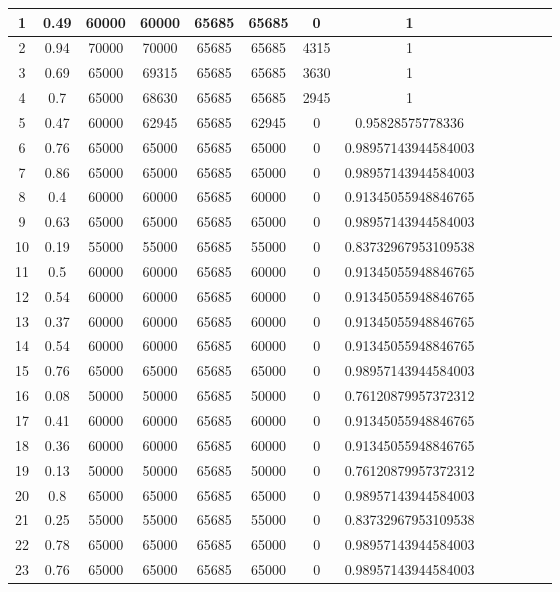 \documentclass[10pt,a4paper,titlepage]{report}
\begin{document}
\begin{center}
\begin{table}
\begin{tabular}{ | c | c | c | c | c | c | c | c | c | c | c | c | c | }
	1 & 0.49 & 60000 & 60000 & 65685 & 65685 & 0 & 1 \\ \hline
	2 & 0.94 & 70000 & 70000 & 65685 & 65685 & 4315 & 1 \\ \hline
	3 & 0.69 & 65000 & 69315 & 65685 & 65685 & 3630 & 1  \\ \hline
	4 & 0.7 & 65000 & 68630 & 65685 & 65685 & 2945 & 1  \\ \hline
	5 & 0.47 & 60000 & 62945 & 65685 & 62945 & 0 & 0.95828575778336 \\ \hline
	6 & 0.76 & 65000 & 65000 & 65685 & 65000 & 0 & 0.98957143944584003  \\ \hline
	7 & 0.86 & 65000 & 65000 & 65685 & 65000 & 0 & 0.98957143944584003  \\ \hline
	8 & 0.4 & 60000 & 60000 & 65685 & 60000 & 0 & 0.91345055948846765  \\ \hline
	9 & 0.63 & 65000 & 65000 & 65685 & 65000 & 0 & 0.98957143944584003  \\ \hline
	10 & 0.19 & 55000 & 55000 & 65685 & 55000 & 0 & 0.83732967953109538 \\ \hline
	11 & 0.5 & 60000 & 60000 & 65685 & 60000 & 0 & 0.91345055948846765  \\ \hline
	12 & 0.54 & 60000 & 60000 & 65685 & 60000 & 0 & 0.91345055948846765  \\ \hline
	13 & 0.37 & 60000 & 60000 & 65685 & 60000 & 0 & 0.91345055948846765  \\ \hline
	14 & 0.54 & 60000 & 60000 & 65685 & 60000 & 0 & 0.91345055948846765  \\ \hline
	15 & 0.76 & 65000 & 65000 & 65685 & 65000 & 0 & 0.98957143944584003  \\ \hline
	16 & 0.08 & 50000 & 50000 & 65685 & 50000 & 0 & 0.76120879957372312  \\ \hline
	17 & 0.41 & 60000 & 60000 & 65685 & 60000 & 0 & 0.91345055948846765  \\ \hline
	18 & 0.36 & 60000 & 60000 & 65685 & 60000 & 0 & 0.91345055948846765  \\ \hline
	19 & 0.13 & 50000 & 50000 & 65685 & 50000 & 0 & 0.76120879957372312  \\ \hline
	20 & 0.8 & 65000 & 65000 & 65685 & 65000 & 0 & 0.98957143944584003  \\ \hline
	21 & 0.25 & 55000 & 55000 & 65685 & 55000 & 0 & 0.83732967953109538  \\ \hline
	22 & 0.78 & 65000 & 65000 & 65685 & 65000 & 0 & 0.98957143944584003  \\ \hline
	23 & 0.76 & 65000 & 65000 & 65685 & 65000 & 0 & 0.98957143944584003  \\ \hline

\end{tabular}
\end{table}
\end{center}
\end{document}
